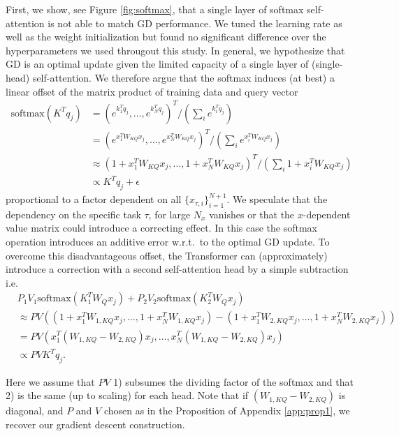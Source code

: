 \documentclass{article}
\theoremstyle{plain}
\theoremstyle{definition}
\theoremstyle{remark}
\begin{document}
First, we show, see Figure \ref{fig:softmax}, that a single layer of softmax self-attention is not able to match GD performance. We tuned the learning rate as well as the weight initialization but found no significant difference over the hyperparameters we used througout this study. In general, we hypothesize that GD is an optimal update given the limited capacity of a single layer of (single-head) self-attention. We  therefore argue that the softmax induces (at best) a linear offset of the matrix product of training data and query vector
\begin{align}
    \text{softmax}(K^Tq_j) &= (e^{k_1^Tq_j}, \dots , e^{k_N^Tq_j})^T/ (\sum_i  e^{k_i^Tq_j}) \\
    &= (e^{x_1^TW_{KQ}x_j}, \dots , e^{x_N^TW_{KQ}x_j})^T/ (\sum_i  e^{x_i^TW_{KQ}x_j}) \\
    &\approx (1 + x_1^TW_{KQ}x_j, \dots , 1 +  x_N^TW_{KQ}x_j)^T/ (\sum_i  1 +  x_i^TW_{KQ}x_j) \\
    &\propto K^Tq_j  + \epsilon
\end{align}
proportional to a factor dependent on all $\{x_{\tau, i}\}_{i=1}^{N+1}$. We speculate that the dependency on the specific task $\tau$, for large $N_x$ vanishes or that the $x$-dependent value matrix could introduce a correcting effect. In this case the softmax operation introduces an additive error w.r.t.~to the optimal GD update. To overcome this disadvantageous offset, the Transformer can (approximately) introduce a correction with a second self-attention head by a simple subtraction i.e.
\begin{align}
 & P_1V_1\text{softmax}(K_1^TW_Qx_j) + P_2V_2\text{softmax}(K_2^TW_Qx_j) \\& \approx PV((1 + x_1^TW_{1,KQ}x_j, \dots , 1 +  x_N^TW_{1, KQ}x_j) -  (1 + x_1^TW_{2, KQ}x_j, \dots , 1 +  x_N^TW_{2, KQ}x_j)) \\ 
 &= PV(x_1^T(W_{1,KQ} - W_{2,KQ})x_j, \dots , x_N^T(W_{1,KQ} - W_{2,KQ})x_j) \\ & \propto PVK^Tq_j.
\end{align}

Here we assume that $PV$ 1) subsumes the dividing factor of the softmax and that 2) is the same (up to scaling) for each head. Note that if $(W_{1,KQ} - W_{2,KQ})$ is diagonal, and $P$ and $V$ chosen as in the Proposition of Appendix \ref{app:prop1}, we recover our gradient descent construction.
\end{document}

